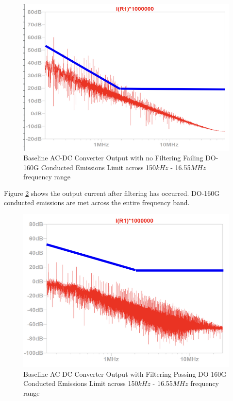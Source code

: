 \documentclass[conference]{IEEEtran}
\begin{document}
\begin{figure}[htp]
    \centering
    \includegraphics[width=1.0\linewidth]{no_output_filter_emissions_limit.png}
    \caption{Baseline AC-DC Converter Output with no Filtering Failing DO-160G Conducted Emissions Limit across 150$kHz$ - 16.55$MHz$ frequency range}
    \label{fig:no_output_filter_emissions_limit_waveform}
\end{figure}

Figure \ref{fig:output_filter_emissions_limit_waveform} shows the output current after filtering has occurred. DO-160G conducted emissions are met across the entire frequency band.

\begin{figure}[htp]
    \centering
    \includegraphics[width=1.0\linewidth]{output_filter_emissions_limit.png}
    \caption{Baseline AC-DC Converter Output with Filtering Passing DO-160G Conducted Emissions Limit across 150$kHz$ - 16.55$MHz$ frequency range}
    \label{fig:output_filter_emissions_limit_waveform}
\end{figure}
\end{document}
